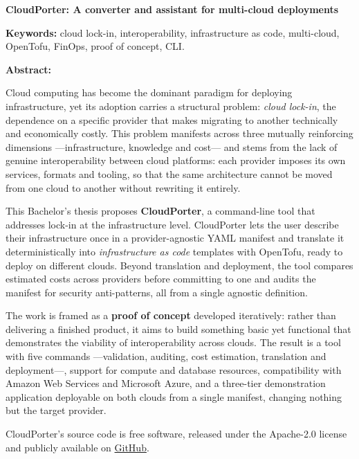 \newpage
\begin{center}
    {\large \textbf{CloudPorter: A converter and assistant for multi-cloud deployments}}

    \vspace{0.2cm}
    {\normalsize \tfgAuthors}

    \vspace{0.2cm}
\end{center}

\vspace{0.5cm}

\textbf{Keywords:} cloud lock-in, interoperability, infrastructure as code, multi-cloud,
OpenTofu, FinOps, proof of concept, CLI.

\vspace{0.5cm}

\textbf{Abstract:}

Cloud computing has become the dominant paradigm for deploying infrastructure, yet its adoption
carries a structural problem: \textit{cloud lock-in}, the dependence on a specific provider that
makes migrating to another technically and economically costly. This problem manifests across
three mutually reinforcing dimensions —infrastructure, knowledge and cost— and stems from the
lack of genuine interoperability between cloud platforms: each provider imposes its own services,
formats and tooling, so that the same architecture cannot be moved from one cloud to another
without rewriting it entirely.

This Bachelor's thesis proposes \textbf{CloudPorter}, a command-line tool that addresses lock-in
at the infrastructure level. CloudPorter lets the user describe their infrastructure once in a
provider-agnostic YAML manifest and translate it deterministically into \textit{infrastructure
as code} templates with OpenTofu, ready to deploy on different clouds. Beyond translation and
deployment, the tool compares estimated costs across providers before committing to one and audits
the manifest for security anti-patterns, all from a single agnostic definition.

The work is framed as a \textbf{proof of concept} developed iteratively: rather than delivering a
finished product, it aims to build something basic yet functional that demonstrates the viability
of interoperability across clouds. The result is a tool with five commands —validation, auditing,
cost estimation, translation and deployment—, support for compute and database resources,
compatibility with Amazon Web Services and Microsoft Azure, and a three-tier demonstration
application deployable on both clouds from a single manifest, changing nothing but the target
provider.

\vspace{0.5cm}

\noindent CloudPorter's source code is free software, released under the Apache-2.0 license and
publicly available on \href{https://github.com/lucpez/cloudporter}{GitHub}.
